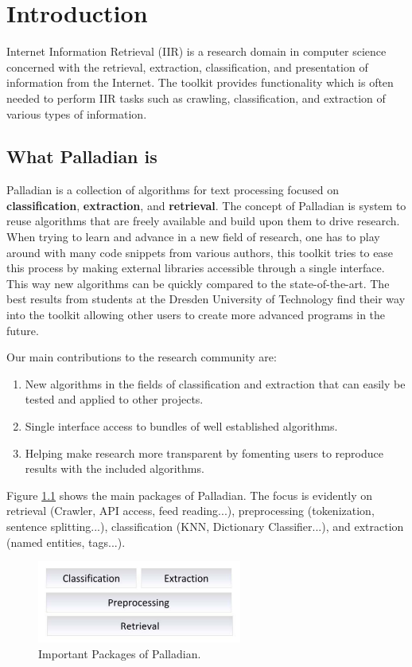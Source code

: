 \chapter{Introduction}
Internet Information Retrieval (IIR) is a research domain in computer science concerned with the retrieval, extraction, classification, and presentation of information from the Internet. The toolkit provides functionality which is often needed to perform IIR tasks such as crawling, classification, and extraction of various types of information.

\section{What Palladian is}
Palladian is a collection of algorithms for text processing focused on \textbf{ classification}, \textbf{ extraction}, and \textbf{ retrieval}. The concept of Palladian is system to reuse algorithms that are freely available and build upon them to drive research. When trying to learn and advance in a new field of research, one has to play around with many code snippets from various authors, this toolkit tries to ease this process by making external libraries accessible through a single interface. This way new algorithms can be quickly compared to the state-of-the-art.
The best results from students at the Dresden University of Technology find their way into the toolkit allowing other users to create more advanced programs in the future.

Our main contributions to the research community are:
\begin{enumerate}
\item New algorithms in the fields of classification and extraction that can easily be tested and applied to other projects.
\item Single interface access to bundles of well established algorithms.
\item Helping make research more transparent by fomenting users to reproduce results with the included algorithms.
\end{enumerate}

Figure \ref{fig:architecture} shows the main packages of Palladian. The focus is evidently on retrieval (Crawler, API access, feed reading...), preprocessing (tokenization, sentence splitting...), classification (KNN, Dictionary Classifier...), and extraction (named entities, tags...).

\begin{figure}[ht!]
\centering
\includegraphics[width=0.6\textwidth]{img/architecture.pdf}
\caption{Important Packages of Palladian.}
\label{fig:architecture}
\end{figure}

